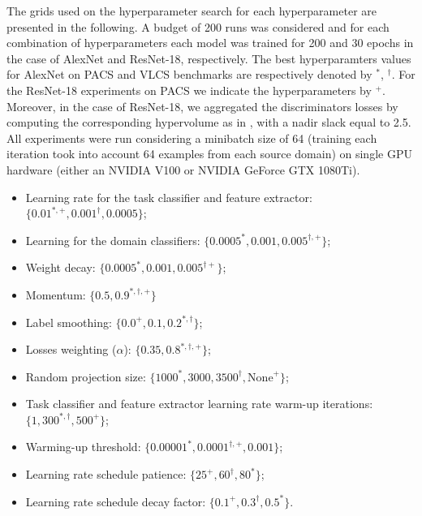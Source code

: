 \documentclass{article}
\begin{document}
The grids used on the hyperparameter search for each hyperparameter are presented in the following. A budget of 200 runs was considered and for each combination of hyperparameters each model was trained for 200 and 30 epochs in the case of AlexNet and ResNet-18, respectively. The best hyperparamters values for AlexNet on PACS and VLCS benchmarks are respectively denoted by  $^*$, $^{\dagger}$. For the ResNet-18 experiments on PACS we indicate the hyperparameters by $^{+}$. Moreover, in the case of ResNet-18, we aggregated the discriminators losses by computing the corresponding hypervolume as in \cite{albuquerque2019multi}, with a nadir slack equal to 2.5. All experiments were run considering a minibatch size of 64 (training each iteration took into account 64 examples from each source domain) on single GPU hardware (either an NVIDIA V100 or NVIDIA GeForce GTX 1080Ti).

\begin{itemize}
    \item Learning rate for the task classifier and feature extractor: $\{0.01^{*, +}, 0.001^{\dagger}, 0.0005\}$;
    \item Learning for the domain classifiers: $\{0.0005^{*}, 0.001, 0.005^{\dagger, +}\}$;
    \item Weight decay: $\{0.0005^{*}, 0.001, 0.005^{\dagger +}\}$;
    \item Momentum: $\{0.5, 0.9^{*, \dagger, +}\}$
    \item Label smoothing: $\{0.0^{+}, 0.1, 0.2^{*, \dagger}\}$;
    \item Losses weighting ($\alpha$): $\{0.35, 0.8^{*, \dagger, +}\}$;
    \item Random projection size: $\{1000^{*}, 3000, 3500^{\dagger}, \text{None}^{+} \}$;
    \item Task classifier and feature extractor learning rate warm-up iterations: $\{1, 300^{*, \dagger}, 500^{+} \}$;
    \item Warming-up threshold: $\{0.00001^{*}, 0.0001^{\dagger, +}, 0.001\}$;
    \item Learning rate schedule patience: $\{25^ {+}, 60^{\dagger}, 80^{*}\}$;
    \item Learning rate schedule decay factor: $\{0.1 ^ {+}, 0.3^{\dagger}, 0.5^{*}\}$.
\end{itemize}
\end{document}
